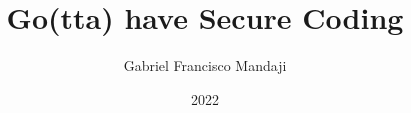 \documentclass{beamer}
\title{Go(tta) have Secure Coding}
\author{Gabriel Francisco Mandaji}
\date{2022}
\begin{document}
\begin{frame}
    \titlepage
\end{frame}




\end{document}
